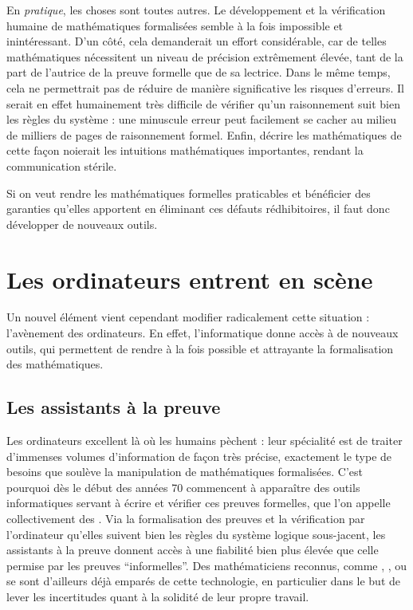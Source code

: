 En \emph{pratique}, les choses sont toutes autres.
Le développement et la vérification humaine de mathématiques
formalisées%
semble à la fois impossible et inintéressant.
D’un côté, cela demanderait un effort considérable, car de telles mathématiques
nécessitent un niveau de précision extrêmement élevée, tant de la part de l’autrice
de la preuve formelle que de sa lectrice.
Dans le même temps, cela ne permettrait pas de réduire de manière significative
les risques d’erreurs. Il serait en effet
humainement très difficile de vérifier qu’un raisonnement suit bien les règles du
système : une minuscule erreur peut facilement se cacher au milieu de
milliers de pages de raisonnement formel.
Enfin, décrire les mathématiques de cette façon noierait
les intuitions mathématiques importantes, rendant la communication stérile.

Si on veut rendre les mathématiques formelles praticables et bénéficier des
garanties qu’elles apportent en éliminant ces défauts rédhibitoires,
il faut donc développer de nouveaux outils.

\section{Les ordinateurs entrent en scène}
\label{sec:assistants-preuve}

Un nouvel élément vient cependant modifier radicalement cette situation :
l’avènement des ordinateurs. En effet, l’informatique donne accès à de nouveaux outils,
qui permettent de rendre à la fois possible et attrayante la formalisation
des mathématiques.

\subsection{Les assistants à la preuve}

Les ordinateurs excellent là où les humains pèchent : leur spécialité est de traiter
d’immenses volumes d’information de façon très précise, exactement le type
de besoins que soulève la manipulation de mathématiques formalisées. C’est pourquoi dès
le début des années 70%
%
%
commencent à apparaître des outils informatiques servant à écrire et vérifier ces
preuves formelles, que l’on appelle collectivement des .
Via la formalisation des preuves et la vérification par l’ordinateur qu’elles
suivent bien les règles du système logique sous-jacent, les assistants à la preuve
donnent accès à une fiabilité bien plus élevée que celle permise par les preuves
“informelles”.
Des mathématiciens reconnus, comme ,
, ou 
se sont d’ailleurs déjà emparés de cette technologie,
en particulier dans le but de lever les incertitudes
quant à la solidité de leur propre travail.

